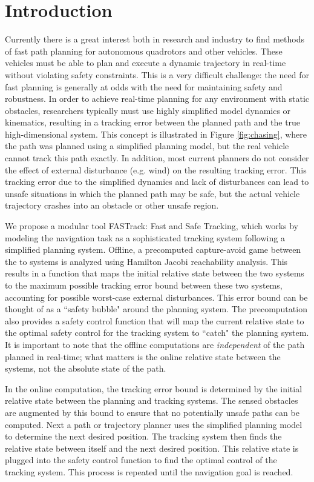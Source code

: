 \section{Introduction}
 Currently there is a great interest both in research and industry to find methods of fast path planning for autonomous quadrotors and other vehicles. These vehicles must be able to plan and execute a dynamic trajectory in real-time without violating safety constraints. This is a very difficult challenge: the need for fast planning is generally at odds with the need for maintaining safety and robustness. In order to achieve real-time planning for any environment with static obstacles, researchers typically must use highly simplified model dynamics or kinematics, resulting in a tracking error between the planned path and the true high-dimensional system. This concept is illustrated in Figure \ref{fig:chasing}, where the path was planned using a simplified planning model, but the real vehicle cannot track this path exactly. In addition, most current planners do not consider the effect of external disturbance (e.g. wind) on the resulting tracking error. This tracking error due to the simplified dynamics and lack of disturbances can lead to unsafe situations in which the planned path may be safe, but the actual vehicle trajectory crashes into an obstacle or other unsafe region.

We propose a modular tool FASTrack: Fast and Safe Tracking, which works by modeling the navigation task as a sophisticated tracking system following a simplified planning system. Offline, a precomputed capture-avoid game between the to systems is analyzed using Hamilton Jacobi reachability analysis. This results in a function that maps the initial relative state between the two systems to the maximum possible tracking error bound between these two systems, accounting for possible worst-case external disturbances. This error bound can be thought of as a ``safety bubble" around the planning system. The precomputation also provides a safety control function that will map the current relative state to the optimal safety control for the tracking system to ``catch" the planning system. It is important to note that the offline computations are \textit{independent} of the path planned in real-time; what matters is the online relative state between the systems, not the absolute state of the path.

In the online computation, the tracking error bound is determined by the initial relative state between the planning and tracking systems. The sensed obstacles are augmented by this bound to ensure that no potentially unsafe paths can be computed. Next a path or trajectory planner uses the simplified planning model to determine the next desired position. The tracking system then finds the relative state between itself and the next desired position. This relative state is plugged into the safety control function to find the optimal control of the tracking system. This process is repeated until the navigation goal is reached. 
  

